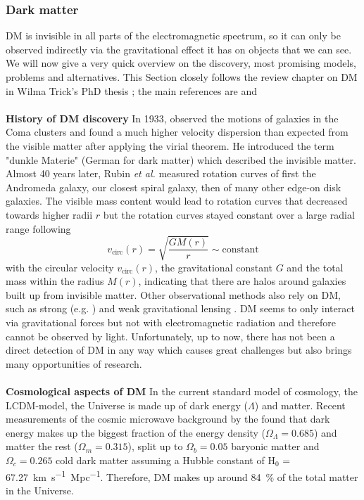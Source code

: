 \subsubsection{Dark matter}
\ac{DM} is invisible in all parts of the electromagnetic spectrum, so it can only be observed indirectly via the gravitational effect it has on objects that we can see. We will now give a very quick overview on the discovery, most promising models, problems and alternatives. This Section closely follows the review chapter on \ac{DM} in Wilma Trick's PhD thesis \citep{Wilmathesis}; the main references are \citet{Ostriker...DM...2003, Maoz...astrophysics...2007} and \citet{Mo...galformev...2010} \\
\\\textbf{History of \ac{DM} discovery} In 1933, \citeauthor{Zwicky...DM...1933} observed the motions of galaxies in the Coma clusters and found a much higher velocity dispersion than expected from the visible matter after applying the virial theorem. He introduced the term "dunkle Materie" (German for dark matter) which described the invisible matter. Almost 40 years later, Rubin \textit{et al.} \citeyearpar{Rubin...DM...1970, Rubin...DM...1978, Rubin...DM...1980} measured rotation curves of first the Andromeda galaxy, our closest spiral galaxy, then of many other edge-on disk galaxies. The visible mass content would lead to rotation curves that decreased towards higher radii $r$ but the rotation curves stayed constant over a large radial range following 
\begin{equation}\label{eq:circ_vel}
    v_{\mathrm{circ}}(r) = \sqrt{\frac{GM(r)}{r}} \sim \mathrm{constant}
\end{equation}
with the circular velocity $v_\mathrm{{circ}}(r)$, the gravitational constant $G$ and the total mass within the radius $M(r)$, indicating that there are halos around galaxies built up from invisible matter. Other observational methods also rely on \ac{DM}, such as strong (e.g. \cite{Trick..stronglensing...2016}) and weak gravitational lensing \citep{Tyson...weaklensing...1990, Kaiser...weaklensing...1993}. \ac{DM} seems to only interact via gravitational forces but not with electromagnetic radiation and therefore cannot be observed by light. Unfortunately, up to now, there has not been a direct detection of \ac{DM} in any way which causes great challenges but also brings many opportunities of research.\\
\\\textbf{Cosmological aspects of \ac{DM}}
In the current standard model of cosmology, the \ac{LCDM}-model, the Universe is made up of dark energy ($\Lambda$) and matter. Recent measurements of the cosmic microwave background by the \citet{Planck...CMB...2018} found that dark energy makes up the biggest fraction of the energy density ($\Omega_\Lambda = 0.685$) and matter the rest ($\Omega_m = 0.315$), split up to $\Omega_b = 0.05$ baryonic matter and $\Omega_c = 0.265$ cold dark matter assuming a Hubble constant of H$_0$ =  \SI{67.27}{km.s^{-1}.Mpc^{-1}}. Therefore, \ac{DM} makes up around \SI{84}{\%} of the total matter in the Universe. \\
